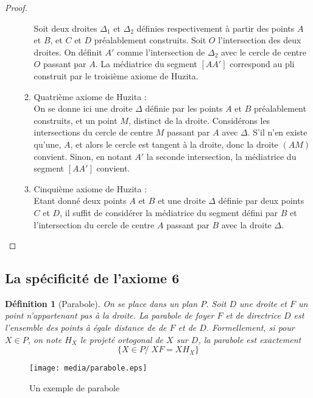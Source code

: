 \documentclass[a4paper,12pt,french]{report}
\newtheorem{definition}{Définition}[section]
\begin{document}
\begin{proof}
\begin{enumerate}
\begin{enumerate}
					Soit deux droites $\Delta_1$ et $\Delta_2$ définies respectivement à partir des points $A$ et $B$, et $C$ et $D$ préalablement construits. Soit $O$ l'intersection des deux droites. On définit $A'$ comme l'intersection de $\Delta_2$ avec le cercle de centre $O$ passant par $A$. La médiatrice du segment $[AA']$ correspond au pli construit par le troisième axiome de Huzita.
				
				\item{Quatrième axiome de Huzita :}\\
					On se donne ici une droite $\Delta$ définie par les points $A$ et $B$ préalablement construits, et un point $M$, distinct de la droite. Considérons les intersections du cercle de centre $M$ passant par $A$ avec $\Delta$. S'il n'en existe qu'une, $A$, et alors le cercle est tangent à la droite, donc la droite $(AM)$ convient. Sinon, en notant $A'$ la seconde intersection, la médiatrice du segment $[AA']$ convient.
				\item{Cinquième axiome de Huzita :}\\
					Etant donné deux points $A$ et $B$ et une droite $\Delta$ définie par deux points $C$ et $D$, il suffit de considérer la médiatrice du segment défini par $B$ et l'intersection du cercle de centre $A$ passant par $B$ avec la droite $\Delta$.
				\end{enumerate}
			\end{enumerate}
			\end{proof}

\subsection{La spécificité de l'axiome 6}
			
			\begin{definition}[Parabole]
				On se place dans un plan $P$. Soit $D$ une droite et $F$ un point n'appartenant pas à la droite. La parabole de foyer $F$ et de directrice $D$ est l'ensemble des points à égale distance de de $F$ et de $D$. Formellement, si pour $X \in P$, on note $H_{X}$ le projeté ortogonal de $X$ sur $D$, la parabole est exactement  
				\[\{X\in P /\; XF = XH_{X}\}\]
			\end{definition}
			
			\begin{figure}
			\begin{center}
				\texttt{[image: media/parabole.eps]}
			\end{center}
			\caption{Un exemple de parabole}
			\end{figure}
			
\end{document}
